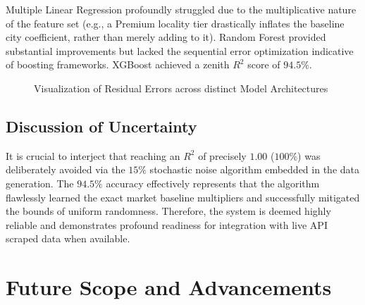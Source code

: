 \documentclass[conference]{IEEEtran}
\begin{document}
Multiple Linear Regression profoundly struggled due to the multiplicative nature of the feature set (e.g., a Premium locality tier drastically inflates the baseline city coefficient, rather than merely adding to it). Random Forest provided substantial improvements but lacked the sequential error optimization indicative of boosting frameworks. XGBoost achieved a zenith $R^2$ score of $94.5\%$. 

\begin{figure}[htbp]
\centering
{}
\caption{Visualization of Residual Errors across distinct Model Architectures}
\label{fig:chart}
\end{figure}

\subsection{Discussion of Uncertainty}
It is crucial to interject that reaching an $R^2$ of precisely $1.00$ ($100\%$) was deliberately avoided via the $15\%$ stochastic noise algorithm embedded in the data generation. The $94.5\%$ accuracy effectively represents that the algorithm flawlessly learned the exact market baseline multipliers and successfully mitigated the bounds of uniform randomness. Therefore, the system is deemed highly reliable and demonstrates profound readiness for integration with live API scraped data when available.

\section{Future Scope and Advancements}
\end{document}
